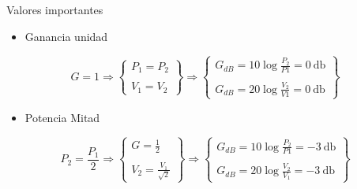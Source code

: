 \documentclass[xcolor={usenames,svgnames,dvipsnames}]{beamer}
\begin{document}
\begin{frame}[label={sec:orgdb4e13a}]{Valores importantes}
\begin{itemize}
\item Ganancia unidad
\end{itemize}

\[
  G = 1 \Rightarrow
  \left\{
  \begin{array}{c}
    P_1 = P_2\\
    \\
    V_1 = V_2
  \end{array}
  \right\}
  \Rightarrow
  \left\{
  \begin{array}{c}
    G_{dB} = 10 \log \frac{P_2}{P1} = \SI{0}{\decibel}\\
    \\
    G_{dB} = 20 \log \frac{V_2}{V1} = \SI{0}{\decibel}
  \end{array}
  \right\}
\]

\begin{itemize}
\item Potencia Mitad
\end{itemize}

\[
  P_2 = \frac{P_1}{2} \Rightarrow
  \left\{
  \begin{array}{c}
    G = \frac{1}{2}\\
    \\
    V_2 = \frac{V_1}{\sqrt{2}}
  \end{array}
  \right\}
  \Rightarrow
  \left\{
  \begin{array}{c}
    G_{dB} = 10 \log \frac{P_2}{P1} = -\SI{3}{\decibel}\\
    \\
    G_{dB} = 20 \log \frac{V_2}{V_1} = -\SI{3}{\decibel}
  \end{array}
  \right\}
\]
\end{frame}
\end{document}
